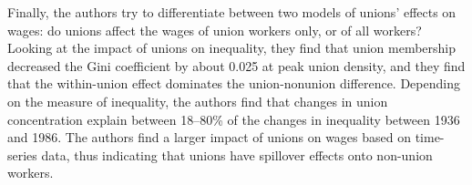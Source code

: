 \documentclass[dvipsnames]{article}
\begin{document}
Finally, the authors try to differentiate between two models of unions' effects on wages: do unions affect the wages of union workers only, or of all workers? Looking at the impact of unions on inequality, they find that union membership decreased the Gini coefficient by about 0.025 at peak union density, and they find that the within-union effect dominates the union-nonunion difference. Depending on the measure of inequality, the authors find that changes in union concentration explain between 18--80\% of the changes in inequality between 1936 and 1986. The authors find a larger impact of unions on wages based on time-series data, thus indicating that unions have spillover effects onto non-union workers. 
\end{document}
